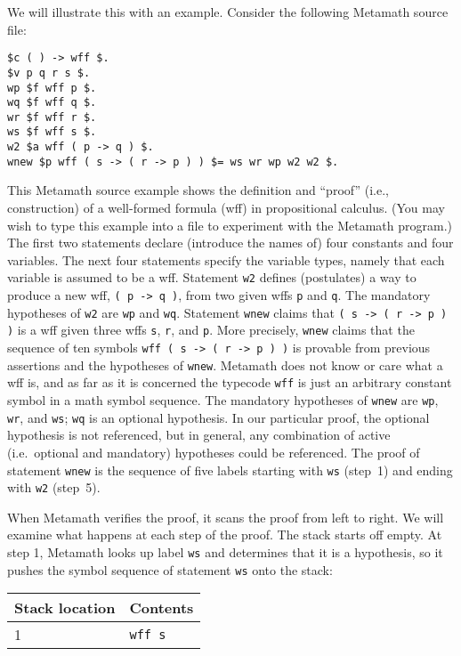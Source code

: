 We will illustrate this with an example.
Consider the following Metamath source file:
\begin{verbatim}
$c ( ) -> wff $.
$v p q r s $.
wp $f wff p $.
wq $f wff q $.
wr $f wff r $.
ws $f wff s $.
w2 $a wff ( p -> q ) $.
wnew $p wff ( s -> ( r -> p ) ) $= ws wr wp w2 w2 $.
\end{verbatim}
This Metamath source example shows the definition and ``proof'' (i.e.,
construction) of a well-formed formula (wff)
in propositional calculus.  (You may wish to type this example into a file to
experiment with the Metamath program.)  The first two statements declare
(introduce the names of) four constants and four variables.  The next four
statements specify the variable types, namely that
each variable is assumed to be a wff.  Statement \texttt{w2} defines (postulates)
a way to produce a new wff, \texttt{( p -> q )}, from two given wffs \texttt{p} and
\texttt{q}. The mandatory hypotheses of \texttt{w2} are \texttt{wp} and \texttt{wq}.
Statement \texttt{wnew} claims that \texttt{( s -> ( r -> p ) )} is a wff given
three wffs \texttt{s}, \texttt{r}, and \texttt{p}.  More precisely, \texttt{wnew} claims
that the sequence of ten symbols \texttt{wff ( s -> ( r -> p ) )} is provable from
previous assertions and the hypotheses of \texttt{wnew}.  Metamath does not know
or care what a wff is, and as far as it is concerned
the typecode \texttt{wff} is just an
arbitrary constant symbol in a math symbol sequence.  The mandatory hypotheses
of \texttt{wnew} are \texttt{wp}, \texttt{wr}, and \texttt{ws}; \texttt{wq} is an optional
hypothesis.  In our particular proof, the optional hypothesis is not
referenced, but in general, any combination of active (i.e.\ optional and
mandatory) hypotheses could be referenced.  The proof of statement \texttt{wnew}
is the sequence of five labels starting with \texttt{ws} (step~1) and ending with
\texttt{w2} (step~5).

When Metamath verifies the proof, it scans the proof from left to right.  We
will examine what happens at each step of the proof.  The stack starts off
empty.  At step 1, Metamath looks up label \texttt{ws} and determines that it is a
hypothesis, so it pushes the symbol sequence of statement \texttt{ws} onto the
stack:

\begin{center}\begin{tabular}{|l|l|}\hline
{Stack location} & {Contents} \\ \hline \hline
1 & \texttt{wff s} \\ \hline
\end{tabular}\end{center}

